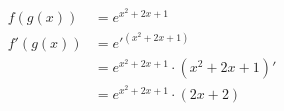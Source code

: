 \documentclass[preview]{standalone}
\begin{document}
\begin{align*}
f(g(x))&=e^{x^2+2x+1}\\ f'(g(x))&=e'^{(x^2+2x+1)}\\ &=e^{x^2+2x+1} \cdot (x^2+2x+1)'\\ &=e^{x^2+2x+1} \cdot (2x+2)
\end{align*}
\end{document}
